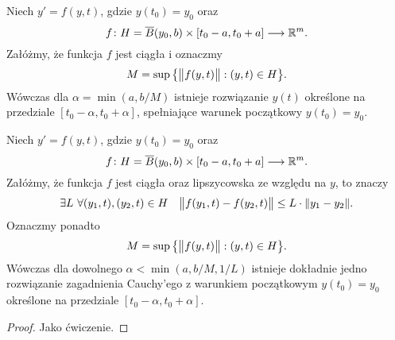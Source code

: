 \begin{theorem}[Peano]
  Niech $y' = f(y,t)$, gdzie $y(t_0) = y_0$ oraz
  \[
    f \colon H = \overline{B} (y_0, b) \times [t_0 - a, t_0 + a] \longrightarrow \R^m.
  \]
  Załóżmy, że funkcja $f$ jest ciągła i oznaczmy
  \[
    M = \sup \big\{ \norm[\big]{f(y,t)} : (y, t) \in H \big\}.
  \]
  Wówczas dla $\alpha = \min(a, b/M)$ istnieje rozwiązanie $y(t)$ określone na
  przedziale $[t_0 - \alpha, t_0 + \alpha]$, spełniające warunek początkowy $y(t_0) = y_0$.
\end{theorem}

\begin{theorem}
  Niech $y' = f(y,t)$, gdzie $y(t_0) = y_0$ oraz
  \[
    f \colon H = \overline{B} (y_0, b) \times [t_0 - a, t_0 + a] \longrightarrow \R^m.
  \]
  Załóżmy, że funkcja $f$ jest ciągła oraz lipszycowska ze względu na $y$, to znaczy
  \[
    \exists L \ \forall (y_1,t), (y_2,t) \in H \quad
    \norm[\big]{f(y_1,t) - f(y_2,t)} \leq L \cdot \norm{y_1 - y_2}.
  \]
  Oznaczmy ponadto
  \[
    M = \sup \big\{ \norm[\big]{f(y,t)} : (y, t) \in H \big\}.
  \]
  Wówczas dla dowolnego $\alpha < \min(a, b/M, 1/L)$ istnieje dokładnie jedno rozwiązanie
  zagadnienia Cauchy'ego z warunkiem początkowym $y(t_0) = y_0$ określone na przedziale
  $[t_0 - \alpha, t_0 + \alpha]$.
\end{theorem}

\begin{proof}
  Jako ćwiczenie.
\end{proof}